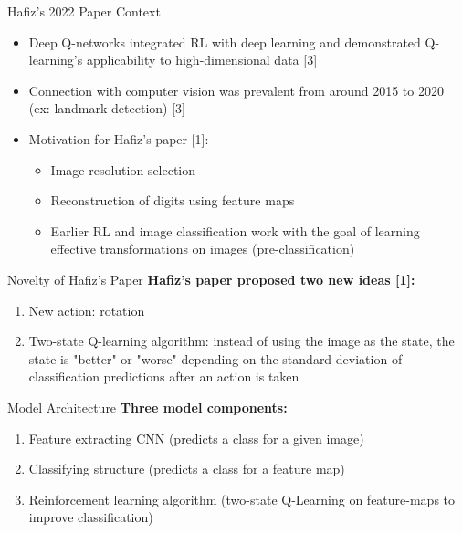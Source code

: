\documentclass[14pt]{beamer}
\begin{document}
\begin{frame}{Hafiz's 2022 Paper Context}
    \fontsize{12pt}{7.2}\selectfont
\begin{itemize}
    \item Deep Q-networks integrated RL with deep learning and demonstrated Q-learning's applicability to high-dimensional data [3]
    \item Connection with computer vision was prevalent from around 2015 to 2020 (ex: landmark detection) [3]
    \item Motivation for Hafiz's paper [1]:
    \begin{itemize}
        \item Image resolution selection 
        \item Reconstruction of digits using feature maps
        \item Earlier RL and image classification work with the goal of learning effective transformations on images (pre-classification)
    \end{itemize}
\end{itemize}
\end{frame}
\begin{frame}{Novelty of Hafiz's Paper}
    \textbf{Hafiz's paper proposed two new ideas [1]:}
    \begin{enumerate}
        \item New action: rotation
        \item Two-state Q-learning algorithm: instead of using the image as the state, the state is "better" or "worse" depending on the standard deviation of classification predictions after an action is taken 
    \end{enumerate}

\end{frame}
\begin{frame}{Model Architecture}
    \textbf{Three model components:}
    \begin{enumerate}
        \item Feature extracting CNN (predicts a class for a given image)
        \item Classifying structure (predicts a class for a feature map)
        \item Reinforcement learning algorithm (two-state Q-Learning on feature-maps to improve classification)
    \end{enumerate}
\end{frame}
\end{document}
